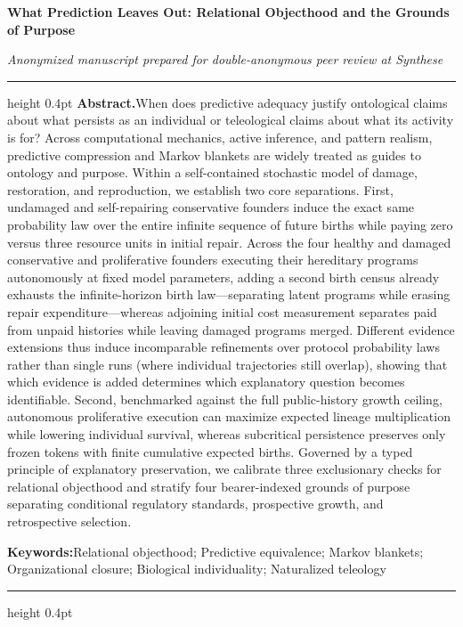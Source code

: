 \documentclass[11pt,a4paper]{article}
\begin{document}
\thispagestyle{plain}
\nolinenumbers
\begin{flushleft}
{\fontsize{17.5}{22}\selectfont\bfseries What Prediction Leaves Out:
Relational Objecthood and the Grounds of Purpose\par}
\vspace{8pt}
{\small\emph{Anonymized manuscript prepared for double-anonymous peer review at Synthese}\par}
\end{flushleft}
\vspace{6pt}
\hrule height 0.4pt
\vspace{8pt}
\linenumbers
\noindent\textbf{Abstract.}\quad When does predictive adequacy justify
ontological claims about what persists as an individual or teleological
claims about what its activity is for? Across computational mechanics,
active inference, and pattern realism, predictive compression and Markov
blankets are widely treated as guides to ontology and purpose. Within a
self-contained stochastic model of damage, restoration, and
reproduction, we establish two core separations. First, undamaged and
self-repairing conservative founders induce the exact same probability
law over the entire infinite sequence of future births while paying zero
versus three resource units in initial repair. Across the four healthy
and damaged conservative and proliferative founders executing their
hereditary programs autonomously at fixed model parameters, adding a
second birth census already exhausts the infinite-horizon birth
law---separating latent programs while erasing repair
expenditure---whereas adjoining initial cost measurement separates paid
from unpaid histories while leaving damaged programs merged. Different
evidence extensions thus induce incomparable refinements over protocol
probability laws rather than single runs (where individual trajectories
still overlap), showing that which evidence is added determines which
explanatory question becomes identifiable. Second, benchmarked against
the full public-history growth ceiling, autonomous proliferative
execution can maximize expected lineage multiplication while lowering
individual survival, whereas subcritical persistence preserves only
frozen tokens with finite cumulative expected births. Governed by a
typed principle of explanatory preservation, we calibrate three
exclusionary checks for relational objecthood and stratify four
bearer-indexed grounds of purpose separating conditional regulatory
standards, prospective growth, and retrospective selection.\par
\vspace{6pt}
\noindent\textbf{Keywords:}\quad Relational objecthood; Predictive
equivalence; Markov blankets; Organizational closure; Biological
individuality; Naturalized teleology\par
\vspace{8pt}
\hrule height 0.4pt
\vspace{12pt}
\end{document}
